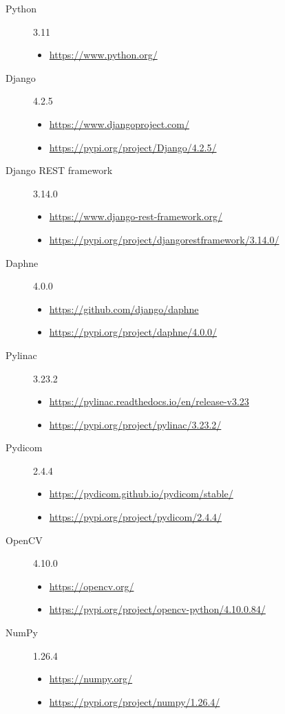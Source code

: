 \begin{description}

    \item[Python] 3.11
    \begin{itemize}
        \item \url{https://www.python.org/}
    \end{itemize}

    \item[Django] 4.2.5
    \begin{itemize}
        \item \url{https://www.djangoproject.com/}
        \item \url{https://pypi.org/project/Django/4.2.5/}
    \end{itemize}

    \item[Django REST framework] 3.14.0
    \begin{itemize}
        \item \url{https://www.django-rest-framework.org/}
        \item \url{https://pypi.org/project/djangorestframework/3.14.0/}
    \end{itemize}

    \item[Daphne] 4.0.0
    \begin{itemize}
        \item \url{https://github.com/django/daphne}
        \item \url{https://pypi.org/project/daphne/4.0.0/}
    \end{itemize}

    \item[Pylinac] 3.23.2
    \begin{itemize}
        \item \url{https://pylinac.readthedocs.io/en/release-v3.23}
        \item \url{https://pypi.org/project/pylinac/3.23.2/}
    \end{itemize}

    \item[Pydicom] 2.4.4
    \begin{itemize}
        \item \url{https://pydicom.github.io/pydicom/stable/}
        \item \url{https://pypi.org/project/pydicom/2.4.4/}
    \end{itemize}

    \item[OpenCV] 4.10.0
    \begin{itemize}
        \item \url{https://opencv.org/}
        \item \url{https://pypi.org/project/opencv-python/4.10.0.84/}
    \end{itemize}

    \item[NumPy] 1.26.4
    \begin{itemize}
        \item \url{https://numpy.org/}
        \item \url{https://pypi.org/project/numpy/1.26.4/}
    \end{itemize}

\end{description}
